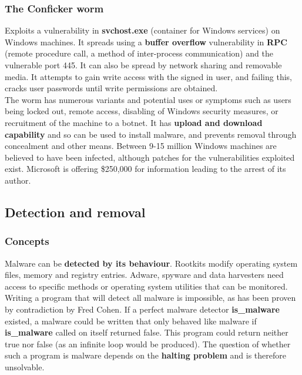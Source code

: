 \documentclass[final]{article}
\newcommand{\np}{\vspace{8pt} \\}
\begin{document}
\subsubsection{The Conficker worm}
Exploits a vulnerability in \textbf{svchost.exe} (container for Windows services) on Windows machines. It spreads using a \textbf{buffer overflow} vulnerability in \textbf{RPC} (remote procedure call, a method of inter-process communication) and the vulnerable port 445. It can also be spread by network sharing and removable media. It attempts to gain write access with the signed in user, and failing this, cracks user passwords until write permissions are obtained. \np
The worm has numerous variants and potential uses or symptoms such as users being locked out, remote access, disabling of Windows security measures, or recruitment of the machine to a botnet. It has \textbf{upload and download capability} and so can be used to install malware, and prevents removal through concealment and other means. Between 9-15 million Windows machines are believed to have been infected, although patches for the vulnerabilities exploited exist. Microsoft is offering \$250,000 for information leading to the arrest of its author.

\subsection{Detection and removal}

\subsubsection{Concepts}
Malware can be \textbf{detected by its behaviour}. Rootkits modify operating system files, memory and registry entries. Adware, spyware and data harvesters need access to specific methods or operating system utilities that can be monitored. \np
Writing a program that will detect all malware is impossible, as has been proven by contradiction by Fred Cohen. If a perfect malware detector \textbf{is\_malware} existed, a malware could be written that only behaved like malware if \textbf{is\_malware} called on itself returned false. This program could return neither true nor false (as an infinite loop would be produced). The question of whether such a program is malware depends on the \textbf{halting problem} and is therefore unsolvable.
\end{document}
